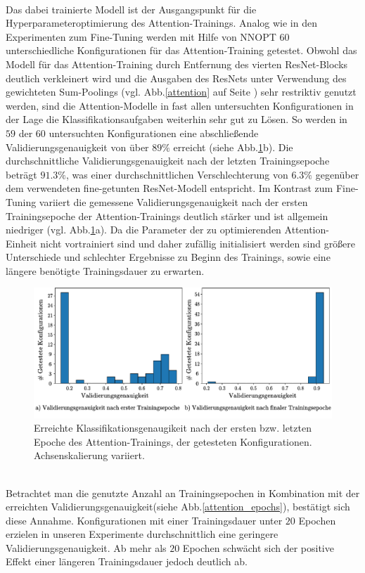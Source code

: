 \\
Das dabei trainierte Modell ist der Ausgangspunkt für die Hyperparameteroptimierung des Attention-Trainings. Analog wie in den Experimenten zum Fine-Tuning werden mit Hilfe von NNOPT $60$ unterschiedliche Konfigurationen für das Attention-Training getestet. Obwohl das Modell für das Attention-Training durch Entfernung des vierten ResNet-Blocks deutlich verkleinert wird und die Ausgaben des ResNets unter Verwendung des gewichteten Sum-Poolings (vgl. Abb.\ref{attention} auf Seite \pageref{attention}) sehr restriktiv genutzt werden, sind die Attention-Modelle in fast allen untersuchten Konfigurationen in der Lage die Klassifikationsaufgaben weiterhin sehr gut zu Lösen. So werden in $59$ der $60$ untersuchten Konfigurationen eine abschließende Validierungsgenauigkeit von über $89\%$ erreicht (siehe Abb.\ref{attention_int_end}b). Die durchschnittliche Validierungsgenauigkeit nach der letzten Trainingsepoche beträgt $91.3\%$, was einer durchschnittlichen Verschlechterung von $6.3\%$ gegenüber dem verwendeten fine-getunten ResNet-Modell entspricht. Im Kontrast zum Fine-Tuning variiert die gemessene Validierungsgenauigkeit nach der ersten Trainingsepoche der Attention-Trainings deutlich stärker und ist allgemein niedriger (vgl. Abb.\ref{attention_int_end}a). Da die Parameter der zu optimierenden Attention-Einheit nicht vortrainiert sind und daher zufällig initialisiert werden sind größere Unterschiede und schlechter Ergebnisse zu Beginn des Trainings, sowie eine längere benötigte Trainingsdauer zu erwarten.
\begin{figure}[h]
\includegraphics[scale=0.75]{NNOPT/init_and_end_perf_attention.pdf}
\caption{Erreichte Klassifikationsgenaugikeit nach der ersten bzw. letzten Epoche des Attention-Trainings, der getesteten Konfigurationen. Achsenskalierung variiert.}
\label{attention_int_end}
\end{figure}
\\
Betrachtet man die genutzte Anzahl an Trainingsepochen in Kombination mit der erreichten Validierungsgenauigkeit(siehe Abb.\ref{attention_epochs}), bestätigt sich diese Annahme. Konfigurationen mit einer Trainingsdauer unter $20$ Epochen erzielen in unseren Experimente durchschnittlich eine geringere Validierungsgenauigkeit. Ab mehr als $20$ Epochen schwächt sich der positive Effekt einer längeren Trainingsdauer jedoch deutlich ab.
